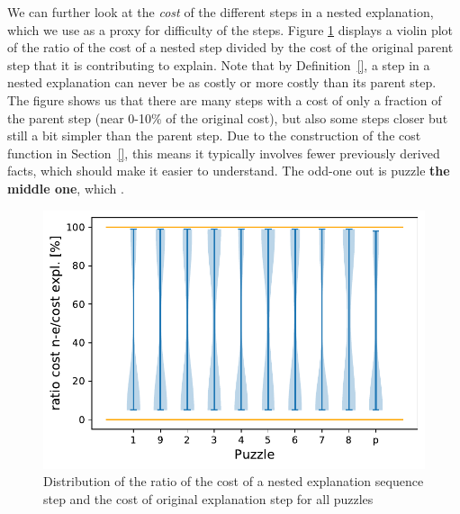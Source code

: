 
We can further look at the \textit{cost} of the different steps in a nested explanation, which we use as a proxy for difficulty of the steps. Figure \ref{fig:experiments:violin} displays a violin plot of the ratio of the cost of a nested step divided by the cost of the original parent step that it is contributing to explain. Note that by Definition~\ref{}, a step in a nested explanation can never be as costly or more costly than its parent step.
The figure shows us that there are many steps with a cost of only a fraction of the parent step (near 0-10\% of the original cost), but also some steps closer but still a bit simpler than the parent step. Due to the construction of the cost function in Section~\ref{}, this means it typically involves fewer previously derived facts, which should make it easier to understand. The odd-one out is puzzle \textbf{the middle one}, which  .

\begin{figure}[t]
	\centering
	\includegraphics[width=.7\textwidth]{figures/violin_plot.pdf}
	\caption{Distribution of the ratio of the cost of a nested explanation sequence step and the cost of original explanation step for all puzzles}
	\label{fig:experiments:violin}
\end{figure}


